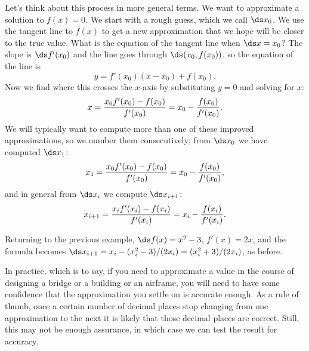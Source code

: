 
Let's think about this process in more general terms. We want to
approximate a solution to $f(x)=0$.
We start with a rough guess, which we call $\ds x_0$.  We use the tangent
line to $f(x)$ to get a new approximation that we hope will be closer
to the true value. What is the equation of the tangent line when
$\ds x=x_0$? The slope is $\ds f'(x_0)$ and the line goes through
$\ds(x_0,f(x_0))$, so the equation of the line is
$$ y=f'(x_0)(x-x_0)+f(x_0).$$
Now we find where this crosses the $x$-axis by substituting $y=0$ and
solving for $x$:
$$x={x_0f'(x_0)-f(x_0)\over f'(x_0)} = x_0 - {f(x_0)\over f'(x_0)}.$$
We will typically want to compute more than one of these improved
approximations, so we number them consecutively; from $\ds x_0$ we have
computed $\ds x_1$:
$$x_1={x_0f'(x_0)-f(x_0)\over f'(x_0)} = x_0 - {f(x_0)\over f'(x_0)},$$
and in general from $\ds x_i$ we compute $\ds x_{i+1}$:
$$x_{i+1}={x_if'(x_i)-f(x_i)\over f'(x_i)} = x_i - {f(x_i)\over f'(x_i)}.$$

\begin{example}
Returning to the previous example, $\ds f(x)=x^2-3$, $f'(x)=2x$, and the
formula becomes $\ds x_{i+1}=x_i - (x_i^2-3)/(2x_i)=(x_i^2+3)/(2x_i)$, as
before.
\end{example}

In practice, which is to say, if you need to approximate a value in
the course of designing a bridge or a building or an airframe, you
will need to have some confidence that the approximation you settle on
is accurate enough. As a rule of thumb, once a certain number of
decimal places stop changing from one approximation to the next it is
likely that those decimal places are correct. Still, this may not be
enough assurance, in which case we can test the result for accuracy.

